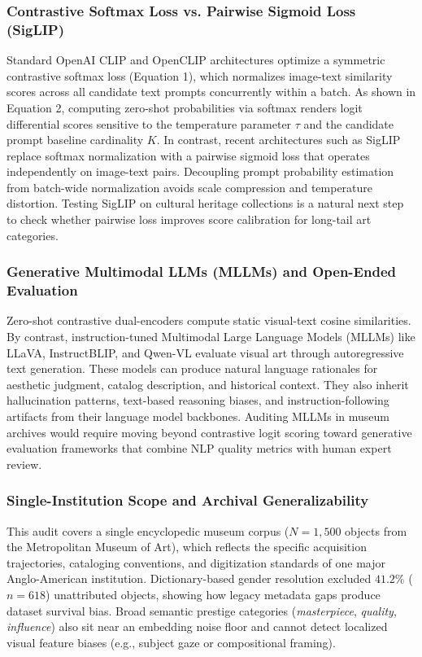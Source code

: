 \documentclass[pdflatex,sn-mathphys-num]{sn-jnl}%
\theoremstyle{thmstyleone}%
\theoremstyle{thmstyletwo}%
\theoremstyle{thmstylethree}%
\begin{document}
\subsubsection{Contrastive Softmax Loss vs. Pairwise Sigmoid Loss (SigLIP)}
Standard OpenAI CLIP and OpenCLIP architectures optimize a symmetric contrastive softmax loss (Equation 1), which normalizes image-text similarity scores across all candidate text prompts concurrently within a batch. As shown in Equation 2, computing zero-shot probabilities via softmax renders logit differential scores sensitive to the temperature parameter $\tau$ and the candidate prompt baseline cardinality $K$. In contrast, recent architectures such as SigLIP \cite{zhai2023sigmoid} replace softmax normalization with a pairwise sigmoid loss that operates independently on image-text pairs. Decoupling prompt probability estimation from batch-wide normalization avoids scale compression and temperature distortion. Testing SigLIP on cultural heritage collections is a natural next step to check whether pairwise loss improves score calibration for long-tail art categories.

\subsubsection{Generative Multimodal LLMs (MLLMs) and Open-Ended Evaluation}
Zero-shot contrastive dual-encoders compute static visual-text cosine similarities. By contrast, instruction-tuned Multimodal Large Language Models (MLLMs) like LLaVA, InstructBLIP, and Qwen-VL evaluate visual art through autoregressive text generation. These models can produce natural language rationales for aesthetic judgment, catalog description, and historical context. They also inherit hallucination patterns, text-based reasoning biases, and instruction-following artifacts from their language model backbones. Auditing MLLMs in museum archives would require moving beyond contrastive logit scoring toward generative evaluation frameworks that combine NLP quality metrics with human expert review.

\subsubsection{Single-Institution Scope and Archival Generalizability}
This audit covers a single encyclopedic museum corpus ($N=1,500$ objects from the Metropolitan Museum of Art), which reflects the specific acquisition trajectories, cataloging conventions, and digitization standards of one major Anglo-American institution. Dictionary-based gender resolution excluded $41.2\%$ ($n=618$) unattributed objects, showing how legacy metadata gaps produce dataset survival bias. Broad semantic prestige categories (\textit{masterpiece}, \textit{quality}, \textit{influence}) also sit near an embedding noise floor and cannot detect localized visual feature biases (e.g., subject gaze or compositional framing).
\end{document}
